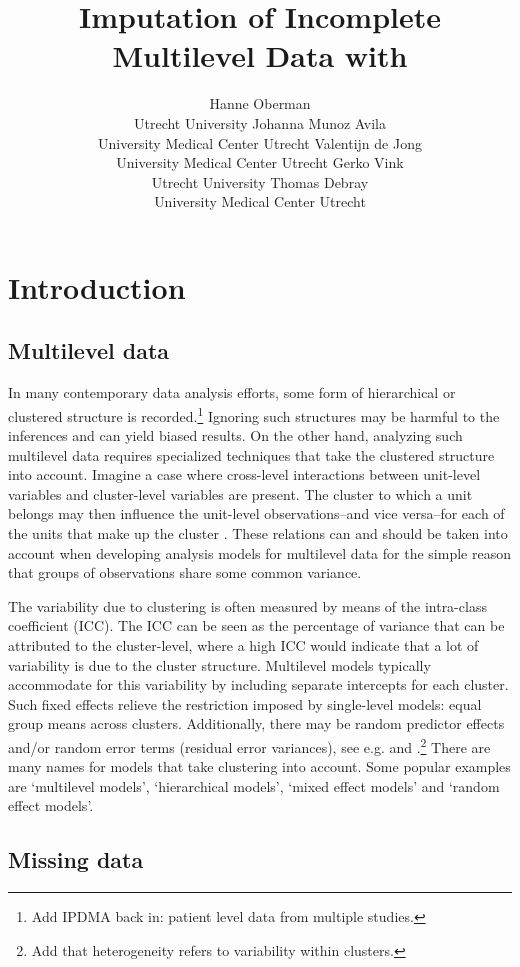 \documentclass[
]{jss}
\author{
Hanne Oberman\\Utrecht University \And Johanna Munoz Avila\\University
Medical Center Utrecht \AND Valentijn de Jong\\University Medical
Center Utrecht \And Gerko Vink\\Utrecht University \AND Thomas
Debray\\University Medical Center Utrecht
}
\title{Imputation of Incomplete Multilevel Data with \pkg{mice}}
\begin{document}
\hypertarget{introduction}{%
\section{Introduction}\label{introduction}}

\hypertarget{multilevel-data}{%
\subsection{Multilevel data}\label{multilevel-data}}

In many contemporary data analysis efforts, some form of hierarchical or
clustered structure is recorded.\footnote{Add IPDMA back in: patient
  level data from multiple studies.} Ignoring such structures may be
harmful to the inferences and can yield biased results. On the other
hand, analyzing such multilevel data requires specialized techniques
that take the clustered structure into account. Imagine a case where
cross-level interactions between unit-level variables and cluster-level
variables are present. The cluster to which a unit belongs may then
influence the unit-level observations--and vice versa--for each of the
units that make up the cluster \citep{hox17}. These relations can and
should be taken into account when developing analysis models for
multilevel data for the simple reason that groups of observations share
some common variance.

The variability due to clustering is often measured by means of the
intra-class coefficient (ICC). The ICC can be seen as the percentage of
variance that can be attributed to the cluster-level, where a high ICC
would indicate that a lot of variability is due to the cluster
structure. Multilevel models typically accommodate for this variability
by including separate intercepts for each cluster. Such fixed effects
relieve the restriction imposed by single-level models: equal group
means across clusters. Additionally, there may be random predictor
effects and/or random error terms (residual error variances), see e.g.
\citet{hox17} and \citet{jong21}.\footnote{Add that heterogeneity refers
  to variability within clusters.} There are many names for models that
take clustering into account. Some popular examples are `multilevel
models', `hierarchical models', `mixed effect models' and `random effect
models'.

\hypertarget{missing-data}{%
\subsection{Missing data}\label{missing-data}}
\end{document}

